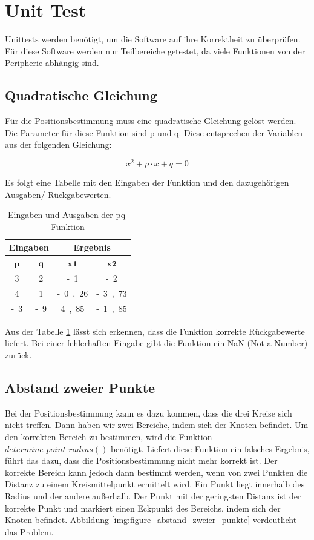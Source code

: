 \newpage
\section{Unit Test}
Unittests werden benötigt, um die Software auf ihre Korrektheit zu überprüfen. Für diese Software werden nur Teilbereiche getestet, da viele Funktionen von der Peripherie abhängig sind.

\subsection{Quadratische Gleichung}
Für die Positionsbestimmung muss eine quadratische Gleichung gelöst werden. Die Parameter für diese Funktion sind \si{p} und \si{q}. Diese entsprechen der Variablen aus der folgenden Gleichung:

\begin{equation}
\label{eq:unit_test_pq_formel}
x^{2} + p \cdot x + q = 0
\end{equation}

Es folgt eine Tabelle mit den Eingaben der Funktion und den dazugehörigen Ausgaben/ Rückgabewerten.

\begin{table}[H]
\centering
\caption{Eingaben und Ausgaben der pq-Funktion}
\label{table:pq_funktion}
\begin{tabular}{|c|c|c|c|}
\hline
\multicolumn{2}{|c|}{\textbf{Eingaben}} & \multicolumn{2}{c|}{\textbf{Ergebnis}} \\ \hline
\textbf{$\mathbf{p}$} & \textbf{$\mathbf{q}$} & \textbf{$\mathbf{x1}$} & \textbf{$\mathbf{x2}$} \\ \hline
\si{3} & \si{2} & \si{-1} & \si{-2} \\ \hline
\si{4} & \si{1} & \si{-0,26} & \si{-3,73} \\ \hline
\si{-3} & \si{-9} & \si{4,85} & \si{-1,85} \\ \hline
\end{tabular}
\end{table}

Aus der Tabelle \ref{table:pq_funktion} lässt sich erkennen, dass die Funktion korrekte Rückgabewerte liefert. Bei einer fehlerhaften Eingabe gibt die Funktion ein \si{NaN} (Not a Number) zurück.

\subsection{Abstand zweier Punkte}
Bei der Positionsbestimmung kann es dazu kommen, dass die drei Kreise sich nicht treffen. Dann haben wir zwei Bereiche, indem sich der Knoten befindet. Um den korrekten Bereich zu bestimmen, wird die Funktion $determine\_point\_radius()$ benötigt. Liefert diese Funktion ein falsches Ergebnis, führt das dazu, dass die Positionsbestimmung nicht mehr korrekt ist. Der korrekte Bereich kann jedoch dann bestimmt werden, wenn von zwei Punkten die Distanz zu einem Kreismittelpunkt ermittelt wird. Ein Punkt liegt innerhalb des Radius und der andere außerhalb. Der Punkt mit der geringsten Distanz ist der korrekte Punkt und markiert einen Eckpunkt des Bereichs, indem sich der Knoten befindet. Abbildung \ref{img:figure_abstand_zweier_punkte} verdeutlicht das Problem.

